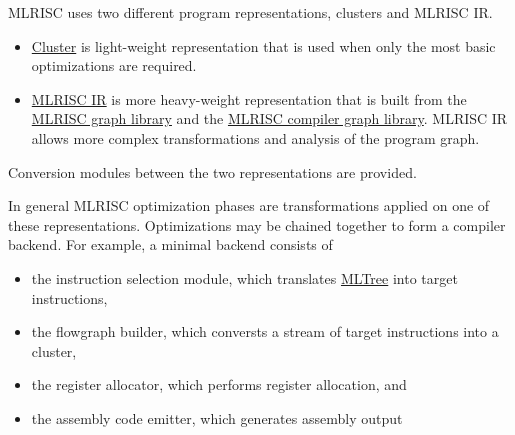   MLRISC uses two different program representations, clusters and MLRISC IR.
\begin{itemize}
  \item \href{cluster.html}{Cluster} is light-weight representation
that is used when only the most basic optimizations are required.
  \item \href{mlrisc-ir.html}{MLRISC IR} is more heavy-weight
   representation that is built from the 
    \href{graphs.html}{MLRISC graph library} and the
    \href{compiler-graphs.html}{MLRISC compiler graph library}.
   MLRISC IR allows more complex transformations and analysis of the
   program graph.
\end{itemize}
Conversion modules between the two representations are provided.

In general MLRISC optimization phases are transformations applied on one
of these representations.  Optimizations may be chained together to form
a compiler backend.  For example, a minimal backend consists of
\begin{itemize}
  \item the instruction selection module, which translates 
\href{mltree.html}{MLTree} into target instructions,
  \item the flowgraph builder, which conversts a stream of target instructions
   into a cluster,
  \item the register allocator, which performs register allocation, and
  \item the assembly code emitter, which generates assembly output
\end{itemize}
